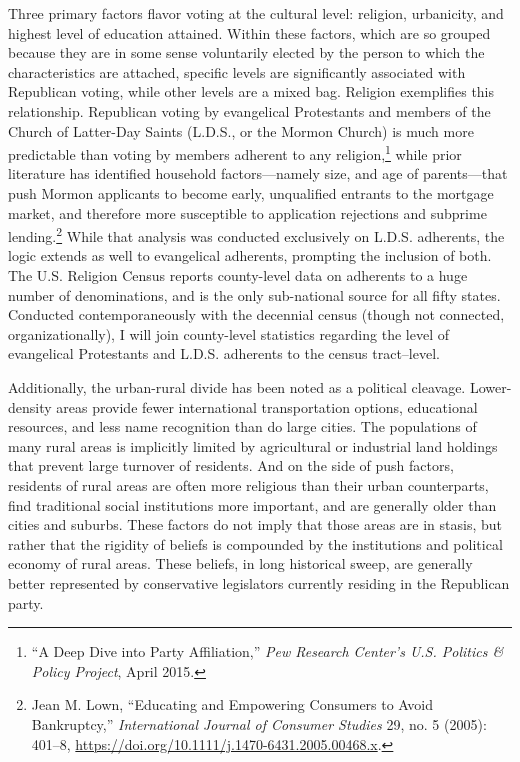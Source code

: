 \documentclass[12pt,oneside]{psthesis}
\begin{document}
Three primary factors flavor voting at the cultural level: religion, urbanicity, and highest level of education attained.
Within these factors, which are so grouped because they are in some sense voluntarily elected by the person to which the characteristics are attached, specific levels are significantly associated with Republican voting, while other levels are a mixed bag.
Religion exemplifies this relationship.
Republican voting by evangelical Protestants and members of the Church of Latter-Day Saints (L.D.S., or the Mormon Church) is much more predictable than voting by members adherent to any religion,\footnote{``A Deep Dive into Party Affiliation,'' \emph{Pew Research Center's U.S. Politics \& Policy Project}, April 2015.} while prior literature has identified household factors---namely size, and age of parents---that push Mormon applicants to become early, unqualified entrants to the mortgage market, and therefore more susceptible to application rejections and subprime lending.\footnote{Jean M. Lown, ``Educating and Empowering Consumers to Avoid Bankruptcy,'' \emph{International Journal of Consumer Studies} 29, no. 5 (2005): 401--8, \url{https://doi.org/10.1111/j.1470-6431.2005.00468.x}.}
While that analysis was conducted exclusively on L.D.S. adherents, the logic extends as well to evangelical adherents, prompting the inclusion of both.
The U.S. Religion Census reports county-level data on adherents to a huge number of denominations, and is the only sub-national source for all fifty states.
Conducted contemporaneously with the decennial census (though not connected, organizationally), I will join county-level statistics regarding the level of evangelical Protestants and L.D.S. adherents to the census tract--level.

Additionally, the urban-rural divide has been noted as a political cleavage.
Lower-density areas provide fewer international transportation options, educational resources, and less name recognition than do large cities.
The populations of many rural areas is implicitly limited by agricultural or industrial land holdings that prevent large turnover of residents.
And on the side of push factors, residents of rural areas are often more religious than their urban counterparts, find traditional social institutions more important, and are generally older than cities and suburbs.
These factors do not imply that those areas are in stasis, but rather that the rigidity of beliefs is compounded by the institutions and political economy of rural areas.
These beliefs, in long historical sweep, are generally better represented by conservative legislators currently residing in the Republican party.
\end{document}
